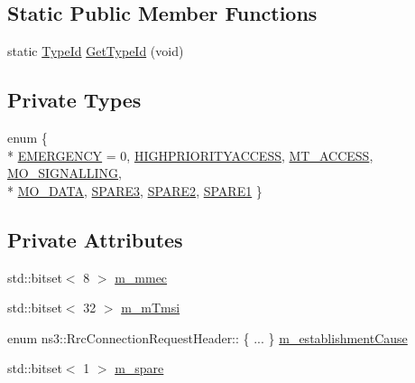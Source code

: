 \subsection*{Static Public Member Functions}
\begin{DoxyCompactItemize}
\item 
static \hyperlink{classns3_1_1TypeId}{Type\+Id} \hyperlink{classns3_1_1RrcConnectionRequestHeader_afe61f26c168c317e806b04df83fa27f3}{Get\+Type\+Id} (void)
\end{DoxyCompactItemize}
\subsection*{Private Types}
\begin{DoxyCompactItemize}
\item 
enum \{ \\*
\hyperlink{classns3_1_1RrcConnectionRequestHeader_ac8740d50774d7543ae4e2def0edc63cfa7f515486579bc82d19775602be6b41c6}{E\+M\+E\+R\+G\+E\+N\+CY} = 0, 
\hyperlink{classns3_1_1RrcConnectionRequestHeader_ac8740d50774d7543ae4e2def0edc63cfa02b133a60f5330eeb19c7e6bc481d470}{H\+I\+G\+H\+P\+R\+I\+O\+R\+I\+T\+Y\+A\+C\+C\+E\+SS}, 
\hyperlink{classns3_1_1RrcConnectionRequestHeader_ac8740d50774d7543ae4e2def0edc63cfa12846acff4c062a26a73da65518f0c65}{M\+T\+\_\+\+A\+C\+C\+E\+SS}, 
\hyperlink{classns3_1_1RrcConnectionRequestHeader_ac8740d50774d7543ae4e2def0edc63cfa4f28c3de97346c652a9f2e59c1a3f380}{M\+O\+\_\+\+S\+I\+G\+N\+A\+L\+L\+I\+NG}, 
\\*
\hyperlink{classns3_1_1RrcConnectionRequestHeader_ac8740d50774d7543ae4e2def0edc63cfa05a64b1cbb8b00b02005a00bdc0d0c3a}{M\+O\+\_\+\+D\+A\+TA}, 
\hyperlink{classns3_1_1RrcConnectionRequestHeader_ac8740d50774d7543ae4e2def0edc63cfad4021425952806c4abb1869cb7338706}{S\+P\+A\+R\+E3}, 
\hyperlink{classns3_1_1RrcConnectionRequestHeader_ac8740d50774d7543ae4e2def0edc63cfa953b6bc55e3365ed0bc8ecf667de52ff}{S\+P\+A\+R\+E2}, 
\hyperlink{classns3_1_1RrcConnectionRequestHeader_ac8740d50774d7543ae4e2def0edc63cfaad34d2ea7e167734cefc68313f8beb26}{S\+P\+A\+R\+E1}
 \}
\end{DoxyCompactItemize}
\subsection*{Private Attributes}
\begin{DoxyCompactItemize}
\item 
std\+::bitset$<$ 8 $>$ \hyperlink{classns3_1_1RrcConnectionRequestHeader_abab1a31ce6a91e3d27bc67b0669ad204}{m\+\_\+mmec}
\item 
std\+::bitset$<$ 32 $>$ \hyperlink{classns3_1_1RrcConnectionRequestHeader_acbd02a83e227f832fe6c0143d74737e3}{m\+\_\+m\+Tmsi}
\item 
enum ns3\+::\+Rrc\+Connection\+Request\+Header\+:: \{ ... \}  \hyperlink{classns3_1_1RrcConnectionRequestHeader_a387b8ec9e546670a37de6c841b4d3981}{m\+\_\+establishment\+Cause}
\item 
std\+::bitset$<$ 1 $>$ \hyperlink{classns3_1_1RrcConnectionRequestHeader_a717284d392b79a8344d76bb526e7f6fc}{m\+\_\+spare}
\end{DoxyCompactItemize}
